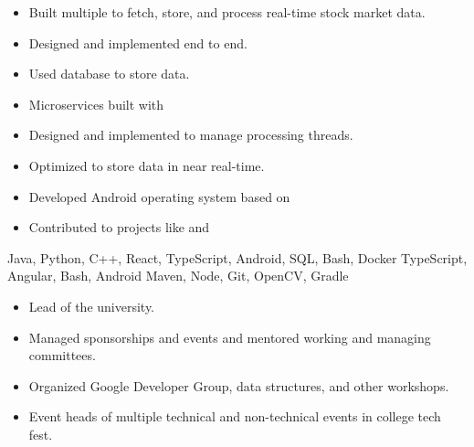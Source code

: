 \begin{itemize}
  \item Built multiple to fetch, store, and process real-time stock market data.
  \item Designed and implemented end to end.
  \item Used database to store data.
  \item Microservices built with 
  \item Designed and implemented to manage processing threads.
  \item Optimized to store data in near real-time.
 \end{itemize}

\begin{itemize}
  \item Developed Android operating system based on 
  \item Contributed to projects like and 
 \end{itemize}

 Java, Python, C++, React, TypeScript, Android, SQL, Bash, Docker\newline
{} TypeScript, Angular, Bash, Android\newline
{} Maven, Node, Git, OpenCV, Gradle\newline

\begin{itemize}
    \item Lead of the university.
    \item Managed sponsorships and events and mentored working and managing committees.
    \item Organized Google Developer Group, data structures, and other workshops.
 \end{itemize}
\begin{itemize}
    \item Event heads of multiple technical and non-technical events in college tech fest.
 \end{itemize}

